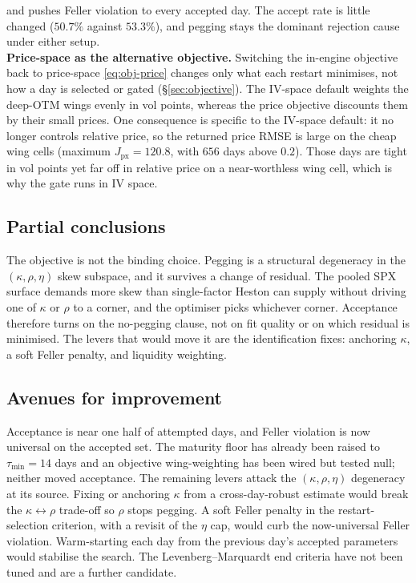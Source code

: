 \documentclass[a4paper, 11pt, reqno]{amsart}
\begin{document}
		and pushes Feller violation to every accepted day. The accept rate is little changed
		($50.7\%$ against $53.3\%$), and pegging stays the dominant rejection cause under either setup.
		\\
		\textbf{Price-space as the alternative objective.} Switching the in-engine objective back to
		price-space \eqref{eq:obj-price} changes only what each restart minimises, not how a day is
		selected or gated (\S\ref{sec:objective}). The IV-space default weights the deep-OTM wings evenly
		in vol points, whereas the price objective discounts them by their small prices. One consequence
		is specific to the IV-space default: it no longer controls relative price, so the returned price
		RMSE is large on the cheap wing cells (maximum $J_{\mathrm{px}}=120.8$, with $656$ days above
		$0.2$). Those days are tight in vol points yet far off in relative price on a near-worthless wing
		cell, which is why the gate runs in IV space.
		
		\subsection{Partial conclusions} 
			The objective is not the binding choice. Pegging is a structural
			degeneracy in the $(\kappa,\rho,\eta)$ skew subspace, and it survives a change of residual. The
			pooled SPX surface demands more skew than single-factor Heston can supply without driving one of
			$\kappa$ or $\rho$ to a corner, and the optimiser picks whichever corner. Acceptance therefore
			turns on the no-pegging clause, not on fit quality or on which residual is minimised. The levers
			that would move it are the identification fixes: anchoring $\kappa$, a soft Feller penalty, and
			liquidity weighting.
		
		\subsection{Avenues for improvement}\label{sec:improvements} 
			Acceptance is near one half of attempted days, and Feller violation is now universal on the accepted 
			set. The maturity floor has already been raised to $\tau_{\min}=14$ days and an objective wing-weighting 
			has been wired but tested null; neither moved acceptance. The remaining levers attack the $(\kappa,\rho,\eta)$ 
			degeneracy at its source. Fixing or anchoring $\kappa$ from a cross-day-robust estimate would break the 
			$\kappa\!\leftrightarrow\!\rho$ trade-off so $\rho$ stops pegging. A soft Feller penalty in the restart-selection 
			criterion, with a revisit of the $\eta$ cap, would curb the now-universal Feller violation. Warm-starting each day
			from the previous day's accepted parameters would stabilise the search. The Levenberg--Marquardt
			end criteria have not been tuned and are a further candidate.
		
\end{document}
